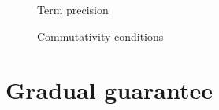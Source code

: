 \begin{figure}
\raggedright {}
\begin{prooftree}
\end{prooftree}
\begin{prooftree}
\end{prooftree}
\begin{prooftree}
\end{prooftree}
\begin{prooftree}
\end{prooftree}
\caption{Term precision}
\end{figure}

\begin{figure}
\raggedright {}
\begin{prooftree}
\end{prooftree}
\begin{prooftree}
\end{prooftree}
\raggedright {}
\begin{prooftree}
\end{prooftree}
\begin{prooftree}
\end{prooftree}
\caption{Commutativity conditions}
\end{figure}

\clearpage

\section{Gradual guarantee}

